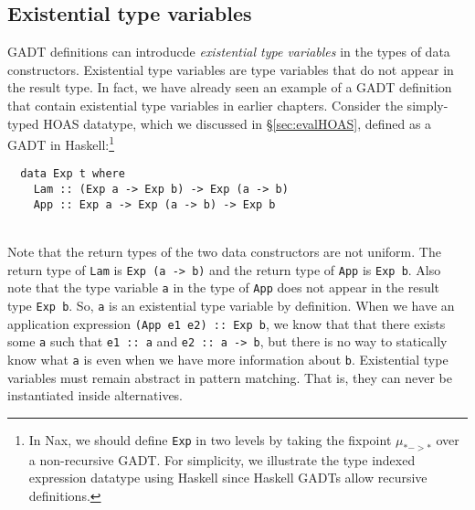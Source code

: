 \subsection{Existential type variables}
\label{sec:naxTyInfer:gadt:ex}
GADT definitions can introducde \emph{existential type variables}
in the types of data constructors. Existential type variables are
type variables that do not appear in the result type. In fact,
we have already seen an example of a GADT definition that contain
existential type variables in earlier chapters. Consider
the simply-typed HOAS datatype, which we discussed in \S\ref{sec:evalHOAS},
defined as a GADT in Haskell:\footnote{
	In Nax, we should define \texttt{Exp} in two levels
	by taking the fixpoint $\mu_{* -> *}$ over a non-recursive GADT.
	For simplicity, we illustrate the type indexed expression datatype
	using Haskell since Haskell GADTs allow recursive definitions.}
\vspace*{-5.2ex}
\begin{singlespace}
\begin{verbatim}
  data Exp t where
    Lam :: (Exp a -> Exp b) -> Exp (a -> b)
    App :: Exp a -> Exp (a -> b) -> Exp b
\end{verbatim}
\end{singlespace}
~\vspace*{-5.3ex}\\
Note that the return types of the two data constructors are not uniform.
The return type of \texttt{Lam} is \texttt{Exp (a -> b)} and
the return type of \texttt{App} is \texttt{Exp b}. Also note that
the type variable \texttt{a} in the type of \texttt{App} does not appear in
the result type \texttt{Exp b}. So, \texttt{a} is an existential type variable
by definition. When we have an application expression
\texttt{\;(App e1 e2)~::~Exp b}, we know that that there exists some \texttt{a}
such that \texttt{\;e1~::~a\;} and \texttt{\;e2~::~a -> b}, but there is no way
to statically know what \texttt{a} is even when we have more information about
\texttt{b}. Existential type variables must remain abstract in pattern matching.
That is, they can never be instantiated inside alternatives.

